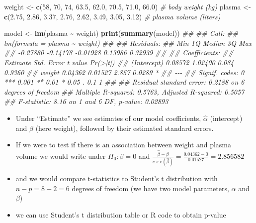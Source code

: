 \documentclass[
]{book}
\newenvironment{Shaded}{\begin{snugshade}}{\end{snugshade}}
\newcommand{\CommentTok}[1]{\textcolor[rgb]{0.56,0.35,0.01}{\textit{#1}}}
\newcommand{\DecValTok}[1]{\textcolor[rgb]{0.00,0.00,0.81}{#1}}
\newcommand{\FloatTok}[1]{\textcolor[rgb]{0.00,0.00,0.81}{#1}}
\newcommand{\KeywordTok}[1]{\textcolor[rgb]{0.13,0.29,0.53}{\textbf{#1}}}
\newcommand{\NormalTok}[1]{#1}
\newcommand{\OperatorTok}[1]{\textcolor[rgb]{0.81,0.36,0.00}{\textbf{#1}}}
\newcommand{\StringTok}[1]{\textcolor[rgb]{0.31,0.60,0.02}{#1}}
\providecommand{\tightlist}{%
  \setlength{\itemsep}{0pt}\setlength{\parskip}{0pt}}
\theoremstyle{definition}
\theoremstyle{definition}
\theoremstyle{definition}
\theoremstyle{remark}
\begin{document}
\begin{Shaded}
\begin{Highlighting}[]

\NormalTok{weight \textless{}{-}}\StringTok{ }\KeywordTok{c}\NormalTok{(}\DecValTok{58}\NormalTok{, }\DecValTok{70}\NormalTok{, }\DecValTok{74}\NormalTok{, }\FloatTok{63.5}\NormalTok{, }\FloatTok{62.0}\NormalTok{, }\FloatTok{70.5}\NormalTok{, }\FloatTok{71.0}\NormalTok{, }\FloatTok{66.0}\NormalTok{) }\CommentTok{\# body weight (kg)}
\NormalTok{plasma \textless{}{-}}\StringTok{ }\KeywordTok{c}\NormalTok{(}\FloatTok{2.75}\NormalTok{, }\FloatTok{2.86}\NormalTok{, }\FloatTok{3.37}\NormalTok{, }\FloatTok{2.76}\NormalTok{, }\FloatTok{2.62}\NormalTok{, }\FloatTok{3.49}\NormalTok{, }\FloatTok{3.05}\NormalTok{, }\FloatTok{3.12}\NormalTok{) }\CommentTok{\# plasma volume (liters)}

\NormalTok{model \textless{}{-}}\StringTok{ }\KeywordTok{lm}\NormalTok{(plasma }\OperatorTok{\textasciitilde{}}\StringTok{ }\NormalTok{weight)}
\KeywordTok{print}\NormalTok{(}\KeywordTok{summary}\NormalTok{(model))}
\CommentTok{\#\# }
\CommentTok{\#\# Call:}
\CommentTok{\#\# lm(formula = plasma \textasciitilde{} weight)}
\CommentTok{\#\# }
\CommentTok{\#\# Residuals:}
\CommentTok{\#\#      Min       1Q   Median       3Q      Max }
\CommentTok{\#\# {-}0.27880 {-}0.14178 {-}0.01928  0.13986  0.32939 }
\CommentTok{\#\# }
\CommentTok{\#\# Coefficients:}
\CommentTok{\#\#             Estimate Std. Error t value Pr(\textgreater{}|t|)  }
\CommentTok{\#\# (Intercept)  0.08572    1.02400   0.084   0.9360  }
\CommentTok{\#\# weight       0.04362    0.01527   2.857   0.0289 *}
\CommentTok{\#\# {-}{-}{-}}
\CommentTok{\#\# Signif. codes:  0 \textquotesingle{}***\textquotesingle{} 0.001 \textquotesingle{}**\textquotesingle{} 0.01 \textquotesingle{}*\textquotesingle{} 0.05 \textquotesingle{}.\textquotesingle{} 0.1 \textquotesingle{} \textquotesingle{} 1}
\CommentTok{\#\# }
\CommentTok{\#\# Residual standard error: 0.2188 on 6 degrees of freedom}
\CommentTok{\#\# Multiple R{-}squared:  0.5763,	Adjusted R{-}squared:  0.5057 }
\CommentTok{\#\# F{-}statistic:  8.16 on 1 and 6 DF,  p{-}value: 0.02893}
\end{Highlighting}
\end{Shaded}

\begin{itemize}
\tightlist
\item
  Under ``Estimate'' we see estimates of our model coefficients, \(\hat{\alpha}\) (intercept) and \(\hat{\beta}\) (here weight), followed by their estimated standard errors.
\item
  If we were to test if there is an association between weight and plasma volume we would write under \(H_0: \beta = 0\) and \(\frac{\hat{\beta}-\beta}{e.s.e(\hat{\beta})} = \frac{0.04362-0}{0.01527} = 2.856582\)
\item
  and we would compare t-statistics to Student's t distribution with \(n-p = 8 - 2 = 6\) degrees of freedom (we have two model parameters, \(\alpha\) and \(\beta\))
\item
  we can use Student's t distribution table or R code to obtain p-value
\end{itemize}
\end{document}
